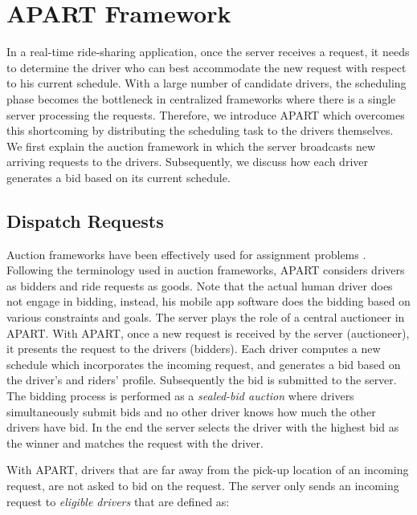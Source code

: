 \section{APART Framework}
\vspace{-1mm}
\label{sec:framework}

In a real-time ride-sharing application, once the server receives a request, it needs to determine the driver who can best accommodate the new request with respect to his current schedule. With a large number of candidate drivers, the scheduling phase becomes the bottleneck in centralized frameworks where there is a single server processing the requests. Therefore, we introduce APART which overcomes this shortcoming by distributing the scheduling task to the drivers themselves. We first explain the auction framework in which the server broadcasts new arriving requests to the drivers. Subsequently, we discuss how each driver generates a bid based on its current schedule.

\subsection{Dispatch Requests}
\label{subsec:dispatch}

Auction frameworks have been effectively used for assignment problems \cite{Lagoudakis04,Mehta05}. Following the terminology used in auction frameworks, APART considers drivers as bidders and ride requests as goods. Note that the actual human driver does not engage in bidding, instead, his mobile app software does the bidding based on various constraints and goals. The server plays the role of a central auctioneer in APART. With APART, once a new request is received by the server (auctioneer), it presents the request to the drivers (bidders). Each driver computes a new schedule which incorporates the incoming request, and generates a bid based on the driver's and riders' profile. Subsequently the bid is submitted to the server. The bidding process is performed as a \textit{sealed-bid auction} where drivers simultaneously submit bids and no other driver knows how much the other drivers have bid. In the end the server selects the driver with the highest bid as the winner and matches the request with the driver.

With APART, drivers that are far away from the pick-up location of an incoming request, are not asked to bid on the request. The server only sends an incoming request to \textit{eligible drivers} that are defined as:


